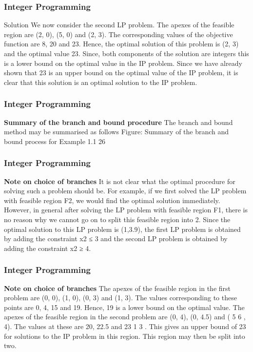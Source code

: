 \begin{frame}
\frametitle{Integer Programming}     
Solution
We now consider the second LP problem. The apexes of the
feasible region are (2, 0), (5, 0) and (2, 3). The corresponding
values of the objective function are 8, 20 and 23.
Hence, the optimal solution of this problem is (2, 3) and the
optimal value 23. Since, both components of the solution are
integers this is a lower bound on the optimal value in the IP
problem.
Since we have already shown that 23 is an upper bound on the
optimal value of the IP problem, it is clear that this solution is an
optimal solution to the IP problem.
\end{frame}  
\begin{frame}
\frametitle{Integer Programming}     
\noindent \textbf{Summary of the branch and bound procedure}
The branch and bound method may be summarised as follows
Figure: Summary of the branch and bound process for Example 1.1 26 \end{frame}  
\begin{frame} \frametitle{Integer Programming}     
\noindent \textbf{Note on choice of branches}
It is not clear what the optimal procedure for solving such a
problem should be. For example, if we first solved the LP problem
with feasible region F2, we would find the optimal solution
immediately.
However, in general after solving the LP problem with feasible
region F1, there is no reason why we cannot go on to split this
feasible region into 2.
Since the optimal solution to this LP problem is (1,3.9), the first
LP problem is obtained by adding the constraint x2 ≤ 3 and the
second LP problem is obtained by adding the constraint x2 ≥ 4.
\end{frame}  
\begin{frame} 
\frametitle{Integer Programming}     
\noindent \textbf{Note on choice of branches}
The apexes of the feasible region in the first problem are (0, 0), (1,
0), (0, 3) and (1, 3). The values corresponding to these points are
0, 4, 15 and 19. Hence, 19 is a lower bound on the optimal value.
The apexes of the feasible region in the second problem are (0, 4),
(0, 4.5) and ( 5
6
, 4). The values at these are 20, 22.5 and 23 1
3
.
This gives an upper bound of 23 for solutions to the IP problem in
this region. This region may then be split into two.
\end{frame}  
